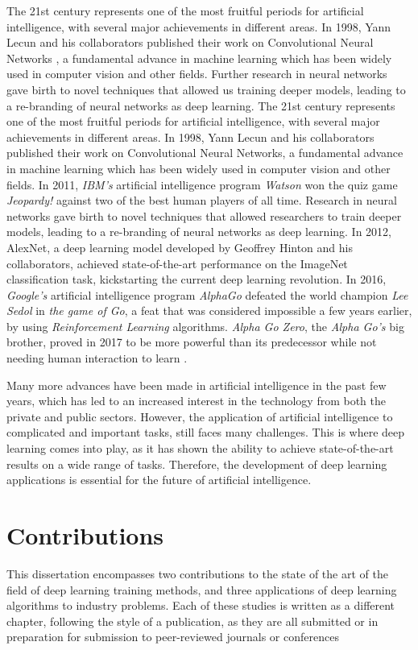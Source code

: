 The 21st century represents one of the most fruitful periods for artificial intelligence, with several major achievements in different areas. In 1998, Yann Lecun and his collaborators published their work on Convolutional Neural Networks \cite{lecun1999}, a fundamental advance in machine learning which has been widely used in computer vision and other fields. Further research in neural networks \cite{hinton2006, hinton2012} gave birth to novel techniques that allowed us training deeper models, leading to a re-branding of neural networks as deep learning. The 21st century represents one of the most fruitful periods for artificial intelligence, with several major achievements in different areas. In 1998, Yann Lecun and his collaborators published their work on Convolutional Neural Networks, a fundamental advance in machine learning which has been widely used in computer vision and other fields. In 2011, \textit{IBM's} artificial intelligence program \textit{Watson} won the quiz game \textit{Jeopardy!} against two of the best human players of all time. Research in neural networks gave birth to novel techniques that allowed researchers to train deeper models, leading to a re-branding of neural networks as deep learning. In 2012, AlexNet, a deep learning model developed by Geoffrey Hinton and his collaborators, achieved state-of-the-art performance on the ImageNet classification task, kickstarting the current deep learning revolution. In 2016, \textit{Google's} artificial intelligence program \textit{AlphaGo} \cite{silver2016} defeated the world champion \textit{Lee Sedol} in \textit{the game of Go}, a feat that was considered impossible a few years earlier, by using \textit{Reinforcement Learning} algorithms. \textit{Alpha Go Zero}, the \textit{Alpha Go's} big brother, proved in 2017 to be more powerful than its predecessor while not needing human interaction to learn \cite{Silver2017a, Silver2017b}.

Many more advances have been made in artificial intelligence in the past few years, which has led to an increased interest in the technology from both the private and public sectors. However, the application of artificial intelligence to complicated and important tasks, still faces many challenges. This is where deep learning comes into play, as it has shown the ability to achieve state-of-the-art results on a wide range of tasks. Therefore, the development of deep learning applications is essential for the future of artificial intelligence.


\section{Contributions}
This dissertation encompasses two contributions to the state of the art of the field of deep learning training methods, and three applications of deep learning algorithms to industry problems. Each of these studies is written as a different chapter, following the style of a publication, as they are all submitted or in preparation for submission to peer-reviewed journals or conferences

